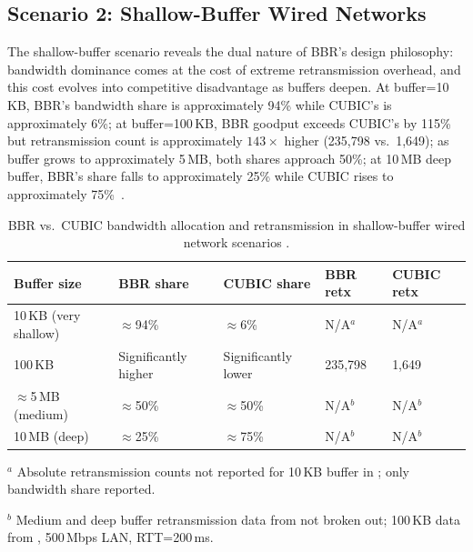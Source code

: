 \documentclass[a4paper,fleqn]{cas-sc}
\begin{document}
\subsection{Scenario 2: Shallow-Buffer Wired Networks}
\label{sec:shallow}

The shallow-buffer scenario reveals the dual nature of BBR's design philosophy:
bandwidth dominance comes at the cost of extreme retransmission overhead, and
this cost evolves into competitive disadvantage as buffers deepen. At
buffer=10\,KB, BBR's bandwidth share is approximately 94\% while CUBIC's is
approximately 6\%; at buffer=100\,KB, BBR goodput exceeds CUBIC's by 115\% but
retransmission count is approximately $143\times$ higher (235,798 vs.\ 1,649);
as buffer grows to approximately 5\,MB, both shares approach 50\%; at 10\,MB
deep buffer, BBR's share falls to approximately 25\% while CUBIC rises to
approximately 75\%~\citep{cao2019bbr,jaeger2019bbr}.

\begin{table}[pos=htbp]
  \caption{BBR vs.\ CUBIC bandwidth allocation and retransmission in shallow-buffer
    wired network scenarios
    \citep{cao2019bbr,jaeger2019bbr}.}
  \label{tab:shallow}
  \small
  \begin{threeparttable}
  \begin{tabularx}{\tblwidth}{@{}lXXXX@{}}
    \toprule
    \textbf{Buffer size} & \textbf{BBR share} & \textbf{CUBIC share}
      & \textbf{BBR retx} & \textbf{CUBIC retx} \\
    \midrule
    10\,KB (very shallow) & $\approx$94\% & $\approx$6\%  & N/A$^{a}$ & N/A$^{a}$ \\
    100\,KB               & Significantly higher & Significantly lower & 235,798 & 1,649 \\
    $\approx$5\,MB (medium)& $\approx$50\% & $\approx$50\% & N/A$^{b}$ & N/A$^{b}$ \\
    10\,MB (deep)         & $\approx$25\% & $\approx$75\% & N/A$^{b}$ & N/A$^{b}$ \\
    \bottomrule
  \end{tabularx}
  \begin{tablenotes}
    \small
    \item $^{a}$ Absolute retransmission counts not reported for 10\,KB buffer in
    \citet{cao2019bbr}; only bandwidth share reported.
    \item $^{b}$ Medium and deep buffer retransmission data from \citet{jaeger2019bbr}
    not broken out; 100\,KB data from \citet{cao2019bbr}, 500\,Mbps LAN, RTT=200\,ms.
  \end{tablenotes}
  \end{threeparttable}
\end{table}
\end{document}
